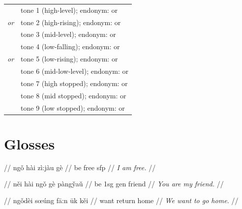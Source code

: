 \documentclass{article}
\begin{document}
\begin{xltabular}{\textwidth}{lL}
   & tone 1 (high-level); endonym:  or  \\
   \textit{or}  & tone 2 (high-rising); endonym:  or  \\
   & tone 3 (mid-level); endonym:  or  \\
   & tone 4 (low-falling); endonym:  or  \\
   \textit{or}  & tone 5 (low-rising); endonym:  or  \\
   & tone 6 (mid-low-level); endonym:  or  \\
   & tone 7 (high stopped); endonym:  or  \\
   & tone 8 (mid stopped); endonym:  or  \\
   & tone 9 (low stopped); endonym:  or  \\
\end{xltabular}

\newpage\section{Glosses}

\ex
\begingl
\gla {}    //
\glb ng\v{o} h\`ai z\`{i}:j\`{a}u g\`e //
 be free {\sc sfp} //
\glft \textit{I am free.} //
\endgl
\xe

\ex
\begingl
\gla {}     //
\glb n\v{e}i h\`ai ng\v{o} g\`e p\`{a}ng\v{y}a\v{u} //
 be {\sc 1sg} {\sc gen} friend //
\glft \textit{You are my friend.} //
\endgl
\xe

\ex
\begingl
\gla {}    //
\glb ng\v{o}d\`ei s\oe\'{u}ng f\=a:n \=uk k\v{e}i //
 want return home //
\glft \textit{We want to go home.} //
\endgl
\xe
\end{document}
